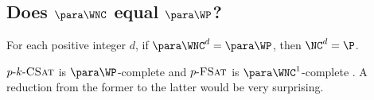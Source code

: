 \subsection{Does \texorpdfstring{$\para \WNC$}{paraWNC} equal \texorpdfstring{$\para \WP$}{paraWP}?}
\label{sec:wncwp}

\begin{conjecture}
  For each positive integer $d$, if $\para \WNC^d = \para \WP$, then $\NC^d = \P$.
\end{conjecture}
\begin{justification}
  $p \textnormal{-} k \textnormal{-} \textsc{CSat}$ is $\para \WP$-complete and $p \textnormal{-} \textsc{FSat}$ is $\para \WNC^1$-complete \autocite[Theorem~3.6]{est15}.
  A reduction from the former to the latter would be very surprising.
\end{justification}
